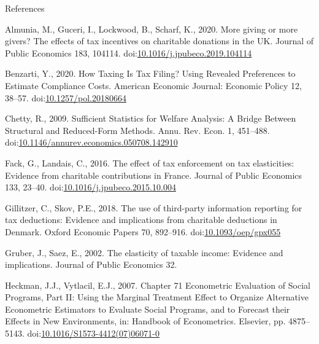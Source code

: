 \documentclass[
  ignorenonframetext,
  aspectratio=169,
]{beamer}
\newlength{\cslhangindent}
\newlength{\cslentryspacingunit} %
\newenvironment{CSLReferences}[2] %
 {%
  \setlength{\parindent}{0pt}
  \ifodd #1
  \let\oldpar\par
  \def\par{\hangindent=\cslhangindent\oldpar}
  \fi
  \setlength{\parskip}{#2\cslentryspacingunit}
 }%
 {}
\begin{document}
\begin{frame}{References}
\hypertarget{refs}{}
\begin{CSLReferences}{1}{0}
\leavevmode{}%
Almunia, M., Guceri, I., Lockwood, B., Scharf, K., 2020. More giving or more givers? {The} effects of tax incentives on charitable donations in the {UK}. Journal of Public Economics 183, 104114. doi:\href{https://doi.org/10.1016/j.jpubeco.2019.104114}{10.1016/j.jpubeco.2019.104114}

\leavevmode{}%
Benzarti, Y., 2020. How {Taxing Is Tax Filing}? {Using Revealed Preferences} to {Estimate Compliance Costs}. American Economic Journal: Economic Policy 12, 38--57. doi:\href{https://doi.org/10.1257/pol.20180664}{10.1257/pol.20180664}

\leavevmode{}%
Chetty, R., 2009. Sufficient {Statistics} for {Welfare Analysis}: {A Bridge Between Structural} and {Reduced-Form Methods}. Annu. Rev. Econ. 1, 451--488. doi:\href{https://doi.org/10.1146/annurev.economics.050708.142910}{10.1146/annurev.economics.050708.142910}

\leavevmode{}%
Fack, G., Landais, C., 2016. The effect of tax enforcement on tax elasticities: {Evidence} from charitable contributions in {France}. Journal of Public Economics 133, 23--40. doi:\href{https://doi.org/10.1016/j.jpubeco.2015.10.004}{10.1016/j.jpubeco.2015.10.004}

\leavevmode{}%
Gillitzer, C., Skov, P.E., 2018. The use of third-party information reporting for tax deductions: Evidence and implications from charitable deductions in {Denmark}. Oxford Economic Papers 70, 892--916. doi:\href{https://doi.org/10.1093/oep/gpx055}{10.1093/oep/gpx055}

\leavevmode{}%
Gruber, J., Saez, E., 2002. The elasticity of taxable income: Evidence and implications. Journal of Public Economics 32.

\leavevmode{}%
Heckman, J.J., Vytlacil, E.J., 2007. Chapter 71 {Econometric Evaluation} of {Social Programs}, {Part II}: {Using} the {Marginal Treatment Effect} to {Organize Alternative Econometric Estimators} to {Evaluate Social Programs}, and to {Forecast} their {Effects} in {New Environments}, in: Handbook of {Econometrics}. {Elsevier}, pp. 4875--5143. doi:\href{https://doi.org/10.1016/S1573-4412(07)06071-0}{10.1016/S1573-4412(07)06071-0}


\end{CSLReferences}
\end{frame}
\end{document}
